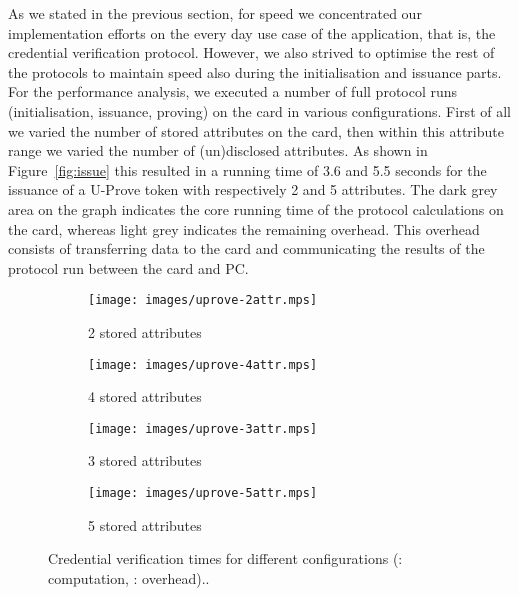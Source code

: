 As we stated in the previous section, for speed we concentrated our
implementation efforts on the every day use case of the application, that is,
the credential verification protocol. However, we also strived to optimise the
rest of the protocols to maintain speed also during the initialisation and
issuance parts. For the performance analysis, we executed a number of full
protocol runs (initialisation, issuance, proving) on the card in various
configurations. First of all we varied the number of stored attributes on the
card, then within this attribute range we varied the number of (un)disclosed
attributes. As shown in Figure~\ref{fig:issue} this resulted in a running time
of 3.6 and 5.5 seconds for the issuance of a U-Prove token with respectively 2
and 5 attributes. The dark grey area on the graph indicates the core running
time of the protocol calculations on the card, whereas light grey indicates the
remaining overhead. This overhead consists of transferring data to the card and
communicating the results of the protocol run between the card and PC.

\begin{figure}[hbt]
  \centering
  \begin{subfigure}[b]{0.45\textwidth}
    \texttt{[image: images/uprove-2attr.mps]}
    \caption{2 stored attributes}
    \label{fig:2attr}
  \end{subfigure}
  \begin{subfigure}[b]{0.45\textwidth}
    \texttt{[image: images/uprove-4attr.mps]}
    \caption{4 stored attributes}
    \label{fig:4attr}
  \end{subfigure}

  \begin{subfigure}[b]{0.45\textwidth}
    \texttt{[image: images/uprove-3attr.mps]}
    \caption{3 stored attributes}
    \label{fig:3attr}
  \end{subfigure}
  \begin{subfigure}[b]{0.45\textwidth}
    \texttt{[image: images/uprove-5attr.mps]}
    \caption{5 stored attributes}
    \label{fig:5attr}
  \end{subfigure}

  \caption[Credential verification times for different configurations.]{
    Credential verification times for different configurations
    (: computation,
      : overhead)..}
  \label{fig:total}
\end{figure}

